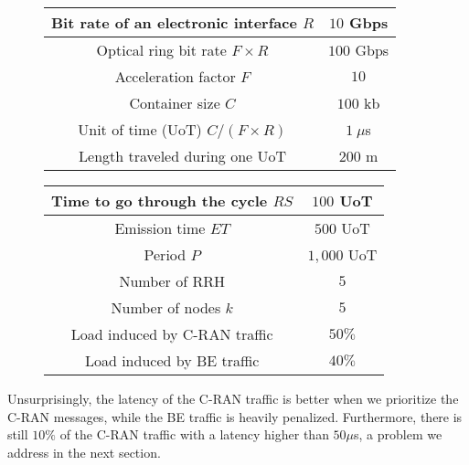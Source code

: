 \begin{figure}[h]
\begin{minipage}[t]{.46\linewidth}
  \scalebox{.55}
  {
  \begin{tabular}{|c|c|}
  \hline
  Bit rate of an electronic interface $R$ & $10$ Gbps \tabularnewline
  \hline
  Optical ring bit rate $F\times R$ & $100$ Gbps \tabularnewline
  \hline
    Acceleration factor $F$ & $10$  \tabularnewline
  \hline
  Container size  $C$ & $100$ kb  \tabularnewline
  \hline
  Unit of time (UoT) $C/(F\times R)$ & $1~\mu$s \tabularnewline
  \hline
  Length traveled during one UoT & $200$ m \tabularnewline
  \hline
    \end{tabular}
  }

\end{minipage} %
\begin{minipage}[t]{.46\linewidth}
   \scalebox{.55}
  {
  \begin{tabular}{|c|c|}
  \hline
  Time to go through the cycle $RS$ & $100$ UoT \tabularnewline
  \hline
  Emission time $ET$ & $500$ UoT \tabularnewline
  \hline
   Period $P$ & $1,000$ UoT \tabularnewline
  \hline
  Number of RRH & $5$  \tabularnewline
  \hline
  Number of nodes $k$ & $5$  \tabularnewline
  \hline
   Load induced by C-RAN traffic & $50\%$  \tabularnewline
  \hline
    Load induced by BE traffic & $40\%$  \tabularnewline
  \hline
  \end{tabular}
}
\end{minipage}
  \label{fig:params}
\end{figure}



Unsurprisingly, the latency of the C-RAN traffic is better when we prioritize the C-RAN messages, while the BE traffic is heavily penalized. Furthermore, there is still $10\%$ of the C-RAN traffic with a latency higher than $50 \mu$s, a problem we address in the next section.



